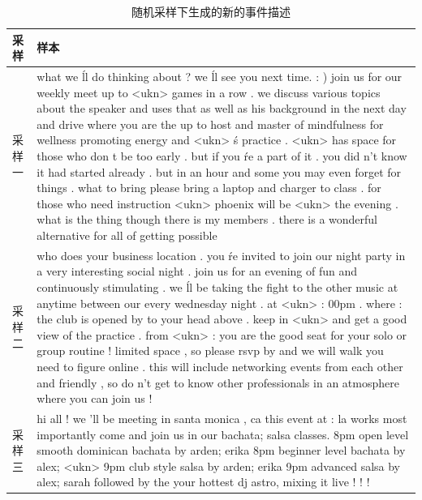 \begin{longtable}{p{.1\linewidth}p{.85\linewidth}}
\caption{\label{t3-4}随机采样下生成的新的事件描述}\\
\toprule
采样&样本\\
\midrule
\endhead
\bottomrule
\endfoot
采样一& what we \'ll do thinking about ? we \'ll see you next time. : ) join us for our weekly meet up to <ukn> games in a row . we discuss various topics about the speaker and uses that as well as his background in the next day and drive where you are the up to host and master of mindfulness for wellness promoting energy and <ukn> \'s practice . <ukn> has space for those who don t be too early . but if you \'re a part of it . you did n't know it had started already . but in an hour and some you may even forget for things . what to bring please bring a laptop and charger to class . for those who need instruction <ukn> phoenix will be <ukn> the evening . what is the thing though there is my members . there is a wonderful alternative for all of getting possible  \\
采样二 & who does your business location . you \'re invited to join our night party in a very interesting social night . join us for an evening of fun and continuously stimulating . we \'ll be taking the fight to the other music at anytime between our every wednesday night . at <ukn> : 00pm . where : the club is opened by to your head above . keep in <ukn> and get a good view of the practice . from <ukn> : you are the good seat for your solo or group routine ! limited space , so please rsvp by and we will walk you need to figure online . this will include networking events from each other and friendly , so do n't get to know other professionals in an atmosphere where you can join us ! \\
采样三& hi all ! we 'll be meeting in santa monica , ca this event at : la works most importantly come and join us in our bachata; salsa classes. 8pm open level smooth dominican bachata by arden; erika 8pm beginner level bachata by alex; <ukn> 9pm club style salsa by arden; erika 9pm advanced salsa by alex; sarah followed by the your hottest dj astro, mixing it live ! ! !\\
\end{longtable}

%  
